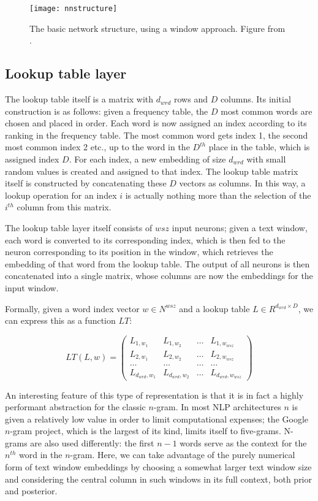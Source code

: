 \begin{figure}
  \texttt{[image: nnstructure]}
  \caption{The basic network structure, using a window
approach. Figure from
\cite[2499]{collobert-2011}.} \label{fig:nnstructure}
\end{figure}

\subsection{Lookup table layer} The lookup table itself is a matrix
with $d_{wrd}$ rows and $D$ columns. Its initial construction is as
follows: given a frequency table, the $D$ most common words are chosen
and placed in order. Each word is now assigned an index according to
its ranking in the frequency table. The most common word gets index 1,
the second most common index 2 etc., up to the word in the $D^{th}$
place in the table, which is assigned index $D$. For each index, a new
embedding of size $d_{wrd}$ with small random values is created and
assigned to that index. The lookup table matrix itself is constructed
by concatenating these $D$ vectors as columns.  In this way, a lookup
operation for an index $i$ is actually nothing more than the selection
of the $i^{th}$ column from this matrix.

The lookup table layer itself consists of $wsz$ input neurons; given a
text window, each word is converted to its corresponding index, which
is then fed to the neuron corresponding to its position in the window,
which retrieves the embedding of that word from the lookup table. The
output of all neurons is then concatenated into a single matrix, whose
columns are now the embeddings for the input window.

Formally, given a word index vector $w \in N^{wsz}$ and a lookup table
$L \in R^{d_{wrd} \times D}$, we can express this as a function
$LT$:

\begin{equation} \label{eq:ltmatrix} LT(L, w) =
\left( \begin{array}{cccc} L_{1,w_1} & L_{1,w_2} & \ldots &
L_{1,w_{wsz}} \\ L_{2,w_1} & L_{2,w_2} & \ldots & L_{2,w_{wsz}} \\
\ldots & \ldots & \ldots & \ldots \\ L_{d_{wrd},w_1} & L_{d_{wrd},w_2}
& \ldots & L_{d_{wrd},w_{wsz}} \end{array} \right)
\end{equation}

An interesting feature of this type of representation is that it is in
fact a highly performant abstraction for the classic $n$-gram. In most
NLP architectures $n$ is given a relatively low value in order to
limit computational expenses; the Google $n$-gram project, which is the
largest of its kind, limits itself to five-grams. N-grams are also
used differently: the first $n - 1$ words serve as the context for the
$n^{th}$ word in the $n$-gram. Here, we can take advantage of the
purely numerical form of text window embeddings by choosing a somewhat
larger text window size and considering the central column in such
windows in its full context, both prior and posterior.


